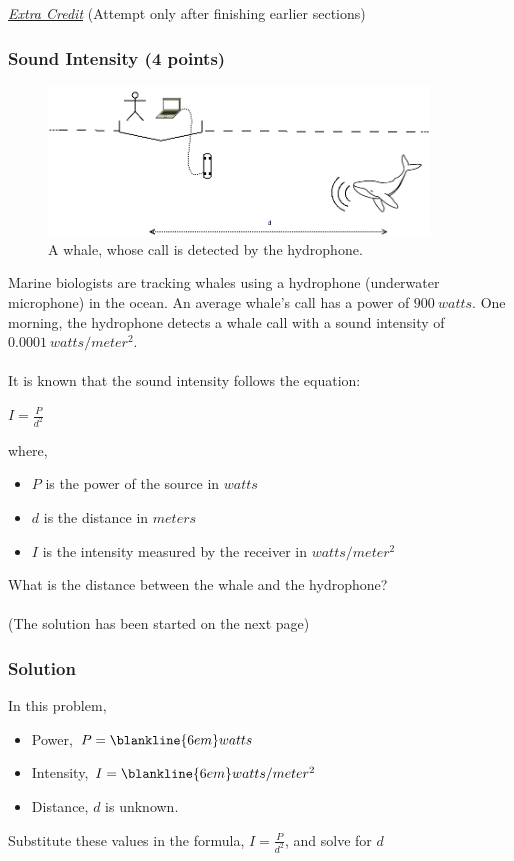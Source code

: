 \documentclass{hw}
\begin{document}
\newpage
\uline{\textit{Extra Credit}}
(Attempt only after finishing earlier sections)
\subsubsection*{\normalsize Sound Intensity (4 points)}
\begin{figure}[h]
    \centering
    \includegraphics[width=0.9\textwidth]{dia/radicals-whale.png}
    \caption{A whale, whose call is detected by the hydrophone.}
    \label{fig:whale}
\end{figure}

Marine biologists are tracking whales using a hydrophone (underwater microphone) in the ocean.
An average whale’s call has a power of $900 \: watts$.
One morning, the hydrophone detects a whale call with a sound intensity of $0.0001 \: watts/meter^2$. \\
\\
It is known that the sound intensity follows the equation:

{\centering
$I = \frac{P}{d^2}$
\par}

where,
\begin{itemize}
    \item $P$ is the power of the source in $watts$
    \item $d$ is the distance in $meters$
    \item $I$ is the intensity measured by the receiver in $watts/meter^2$
\end{itemize}
\bigskip
What is the distance between the whale and the hydrophone? \\
\\ \bigskip
(The solution has been started on the next page)
\newpage
\subsubsection*{\normalsize Solution}
In this problem,
\begin{itemize}
    \item Power, $P = \blankline{6em} watts$
    \item Intensity, $I = \blankline{6em} watts/meter^2$
    \item Distance, $d$ is unknown.
\end{itemize}
\bigskip
Substitute these values in the formula, $I = \frac{P}{d^2}$, and solve for $d$
\end{document}
